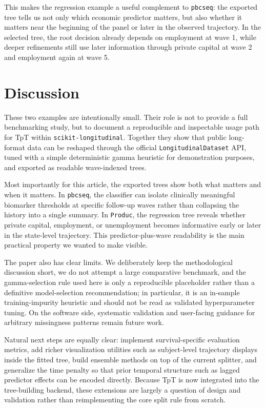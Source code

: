 \documentclass[
]{article}
\begin{document}
This makes the regression example a useful complement to
\texttt{pbcseq}: the exported tree tells us not only which economic
predictor matters, but also whether it matters near the beginning of the
panel or later in the observed trajectory. In the selected tree, the
root decision already depends on employment at wave 1, while deeper
refinements still use later information through private capital at wave
2 and employment again at wave 5.

\section{Discussion}\label{discussion}

These two examples are intentionally small. Their role is not to provide
a full benchmarking study, but to document a reproducible and
inspectable usage path for TpT within \texttt{scikit-longitudinal}.
Together they show that public long-format data can be reshaped through
the official \texttt{LongitudinalDataset} API, tuned with a simple
deterministic gamma heuristic for demonstration purposes, and exported
as readable wave-indexed trees.

Most importantly for this article, the exported trees show both what
matters and when it matters. In \texttt{pbcseq}, the classifier can
isolate clinically meaningful biomarker thresholds at specific follow-up
waves rather than collapsing the history into a single summary. In
\texttt{Produc}, the regression tree reveals whether private capital,
employment, or unemployment becomes informative early or later in the
state-level trajectory. This predictor-plus-wave readability is the main
practical property we wanted to make visible.

The paper also has clear limits. We deliberately keep the methodological
discussion short, we do not attempt a large comparative benchmark, and
the gamma-selection rule used here is only a reproducible placeholder
rather than a definitive model-selection recommendation; in particular,
it is an in-sample training-impurity heuristic and should not be read as
validated hyperparameter tuning. On the software side, systematic
validation and user-facing guidance for arbitrary missingness patterns
remain future work.

Natural next steps are equally clear: implement survival-specific
evaluation metrics, add richer visualization utilities such as
subject-level trajectory displays inside the fitted tree, build ensemble
methods on top of the current splitter, and generalize the time penalty
so that prior temporal structure such as lagged predictor effects can be
encoded directly. Because TpT is now integrated into the tree-building
backend, these extensions are largely a question of design and
validation rather than reimplementing the core split rule from scratch.
\end{document}
